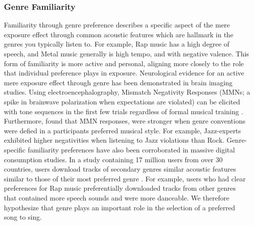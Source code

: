 \subsubsection{Genre Familiarity}
Familiarity through genre preference describes a specific aspect of the mere exposure effect through common acoustic features which are hallmark in the genres you typically listen to. For example, Rap music has a high degree of speech, and Metal music generally is high tempo, and with negative valence. This form of familiarity is more active and personal, aligning more closely to the role that individual preference plays in exposure. Neurological evidence for an active mere exposure effect through genre has been demonstrated in brain imaging studies. Using electroencephalography, Mismatch Negativity Responses (MMNs; a spike in brainwave polarization when expectations are violated) can be elicited with tone sequences in the first few trials regardless of formal musical training \cite{Tervaniemi2014}. Furthermore, \cite{tervaniemi2016auditory} found that MMN responses, were stronger when genre conventions were defied in a participants preferred musical style. For example, Jazz-experts exhibited higher negativities when listening to Jazz violations than Rock. Genre-specific familiarity preferences have also been corroborated in massive digital consumption studies. In a study containing 17 million users from over 30 countries, users download tracks of secondary genres similar acoustic features similar to those of their most preferred genre \cite{barone2017acoustic}. For example, users who had clear preferences for Rap music preferentially downloaded tracks from other genres that contained more speech sounds and were more danceable. We therefore hypothesize that genre plays an important role in the selection of a preferred song to sing.


